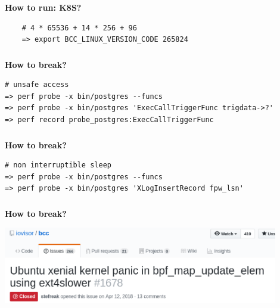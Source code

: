 \documentclass[usenames,dvipsnames, 18pt, compress, aspectratio=169]{beamer}
\begin{document}
\begin{frame}[fragile]{}
    \frametitle{}
    \begin{center}
        \textbf{How to run: K8S?}


		\begin{verbatim}
    # 4 * 65536 + 14 * 256 + 96
    => export BCC_LINUX_VERSION_CODE 265824
        \end{verbatim}

    \end{center}
\end{frame}

\begin{frame}[fragile]{}
    \frametitle{}
    \begin{center}
        \textbf{How to break?}

        \begin{verbatim}
# unsafe access
=> perf probe -x bin/postgres --funcs
=> perf probe -x bin/postgres 'ExecCallTriggerFunc trigdata->?'
=> perf record probe_postgres:ExecCallTriggerFunc
        \end{verbatim}

    \end{center}
\end{frame}

\begin{frame}[fragile]{}
    \frametitle{}
    \begin{center}
        \textbf{How to break?}

        \begin{verbatim}
# non interruptible sleep
=> perf probe -x bin/postgres --funcs
=> perf probe -x bin/postgres 'XLogInsertRecord fpw_lsn'
        \end{verbatim}

    \end{center}
\end{frame}

\begin{frame}[fragile]{}
    \frametitle{}
    \begin{center}
        \textbf{How to break?}

        \includegraphics[width=0.9\textwidth,center]{bcc_kernel_panic.png}

    \end{center}
\end{frame}
\end{document}
